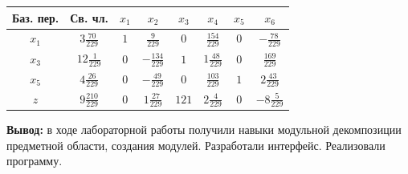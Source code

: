 \documentclass[a4paper,14pt]{extarticle}
\begin{document}
\begin{tabular}{|c|c|c|c|c|c|c|c|}
    \hline
    Баз. пер. & Св. чл.            & $x_1$ & $x_2$              & $x_3$ & $x_4$             & $x_5$ & $x_6$              \\
    \hline
    $x_1$     & $ 3\frac{70}{229}$ & $1$   & $\frac{9}{229}$    & $0$   & $\frac{154}{229}$ & $0$   & $- \frac{78}{229}$ \\
    \hline
    $x_3$     & $12\frac{1}{229}$  & $0$   & $-\frac{134}{229}$ & $1$   & $1\frac{48}{229}$ & $0$   & $\frac{169}{229}$  \\
    \hline
    $x_5$     & $4\frac{26}{229}$  & $0$   & $-\frac{49}{229}$  & $0$   & $\frac{103}{229}$ & $1$   & $2\frac{43}{229}$  \\
    \hline
    $z$       & $9\frac{210}{229}$ & $0$   & $1\frac{27}{229}$  & $121$ & $2\frac{4}{229}$  & $0$   & $-8\frac{5}{229}$  \\
    \hline
\end{tabular}\bigbreak

\textbf{Вывод: } в ходе лабораторной работы получили навыки модульной декомпозиции
предметной области, создания модулей. Разработали интерфейс. Реализовали программу.
\end{document}
